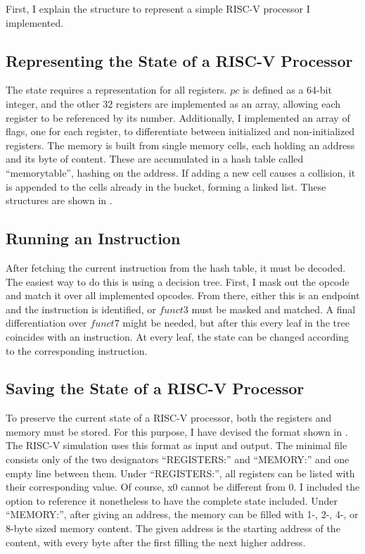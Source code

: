 First, I explain the structure to represent a simple RISC-V processor
I implemented.

\subsection{Representing the State of a RISC-V Processor}
The state requires a representation for all registers. $pc$ is
defined as a 64-bit integer, and the other 32 registers are
implemented as an array, allowing each register to be referenced by
its number. Additionally, I implemented an array of flags, one for
each register, to differentiate between initialized and
non-initialized registers. The memory is built from single memory
cells, each holding an address and its byte of content. These are
accumulated in a hash table called \enquote{memorytable}, hashing on
the address. If adding a new cell causes a collision, it is appended
to the cells already in the bucket, forming a linked list. These
structures are shown in .



\subsection{Running an Instruction}
After fetching the current instruction from the hash table, it must
be decoded. The easiest way to do this is using a decision tree.
First, I mask out the opcode and match it over all implemented
opcodes. From there, either this is an endpoint and the instruction
is identified, or $funct3$ must be masked and matched. A final
differentiation over $funct7$ might be needed, but after this every
leaf in the tree coincides with an instruction. At every leaf, the
state can be changed according to the corresponding instruction.

\subsection{Saving the State of a RISC-V
      Processor}\label{sub:statefile}

To preserve the current state of a RISC-V processor, both the
registers and memory must be stored. For this purpose, I have devised
the format shown in . The RISC-V simulation
uses this format as input and output. The minimal file consists only
of the two designators \enquote{REGISTERS:} and \enquote{MEMORY:} and
one empty line between them. Under \enquote{REGISTERS:}, all
registers can be listed with their corresponding value. Of course, x0
cannot be different from 0. I included the option to reference it
nonetheless to have the complete state included. Under
\enquote{MEMORY:}, after giving an address, the memory can be filled
with 1-, 2-, 4-, or 8-byte sized memory content. The given address is
the starting address of the content, with every byte after the first
filling the next higher address.

